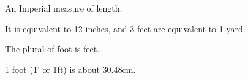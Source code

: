 An Imperial measure of length. 
\par
It is equivalent to 12 inches, and 3 feet are equivalent to 1 yard
\par
The plural of foot is feet.
\par
1 foot (1' or 1ft) is about 30.48cm.